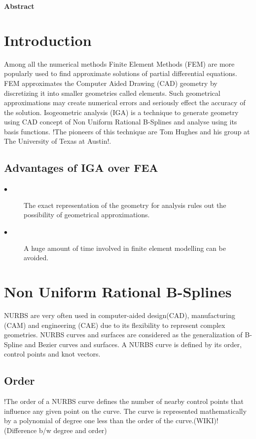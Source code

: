 \documentclass[12pt]{article}
\begin{document}
	\clearpage
	\textbf{\LARGE Abstract}\\ \newline
	\newline
	
	
	\newpage
	\clearpage
	\tableofcontents
	\clearpage
	
\section{Introduction}
Among all the numerical methods Finite Element Methods (FEM) are more popularly used to find approximate solutions of partial differential equations. FEM approximates the Computer Aided Drawing (CAD) geometry by discretizing it into smaller geometries called elements. Such geometrical approximations may create numerical errors and seriously effect the accuracy of the solution.
Isogeometric analysis (IGA) is a technique to generate geometry using CAD concept of Non Uniform Rational B-Splines and analyse using its basis functions. !The pioneers of this technique are Tom Hughes and his group at The University of Texas at Austin!.


\subsection{Advantages of IGA over FEA}
\begin{description}
	\item[$\bullet$]   The exact representation of the geometry for analysis rules out the possibility of geometrical approximations.
	\item[$\bullet$]   A huge amount of time involved in finite element modelling can be avoided.
\end{description}

\section{Non Uniform Rational B-Splines } \label{NURBS}
NURBS are very often used in computer-aided design(CAD), manufacturing (CAM) and engineering (CAE) due to its flexibility to represent complex geometries. NURBS curves and surfaces are considered as the generalization of B-Spline and Bezier curves and surfaces. A NURBS curve is defined by its order, control points and knot vectors.

\subsection{Order }
!The order of a NURBS curve defines the number of nearby control points that influence any given point on the curve. The curve is represented mathematically by a polynomial of degree one less than the order of the curve.(WIKI)! (Difference b/w degree and order)
\end{document}
